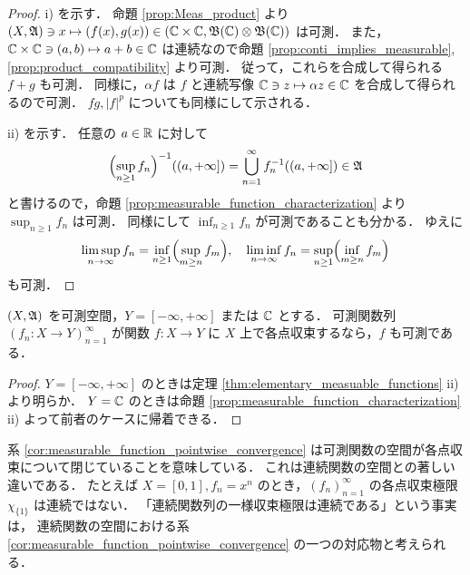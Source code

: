 \begin{proof}
    \textrm{i)} を示す．
    命題 \ref{prop:Meas_product} より $(X,\mathfrak{A})\ni x\mapsto(f(x),g(x))\in(\mathbb{C}\times\mathbb{C},\mathfrak{B}(\mathbb{C})\otimes\mathfrak{B}(\mathbb{C}))$ は可測．
    また，$\mathbb{C}\times\mathbb{C}\ni(a,b)\mapsto a+b\in\mathbb{C}$ は連続なので命題 \ref{prop:conti_implies_measurable}, \ref{prop:product_compatibility} より可測．
    従って，これらを合成して得られる $f+g$ も可測．
    同様に，$\alpha f$ は $f$ と連続写像 $\mathbb{C}\ni z\mapsto\alpha z\in\mathbb{C}$ を合成して得られるので可測．
    $fg,|f|^p$ についても同様にして示される．

    \textrm{ii)} を示す．
    任意の $a\in\mathbb{R}$ に対して
    \begin{align*}
        \Bigl(\sup_{n\ge1}f_n\Bigr)^{-1}((a,+\infty])
        =\bigcup_{n=1}^\infty f_n^{-1}((a,+\infty])\in\mathfrak{A}
    \end{align*}
    と書けるので，命題 \ref{prop:measurable_function_characterization} より $\sup_{n\ge1}f_n$ は可測．
    同様にして $\inf_{n\ge1}f_n$ が可測であることも分かる．
    ゆえに
    \begin{align*}
        \limsup_{n\to\infty}f_n=\inf_{n\ge1}\Bigl(\sup_{m\ge n}f_m\Bigr),\quad
        \liminf_{n\to\infty}f_n=\sup_{n\ge1}\Bigl(\inf_{m\ge n}f_m\Bigr)
    \end{align*}
    も可測．
\end{proof}

\begin{corollary}\label{cor:measurable_function_pointwise_convergence}
    $(X,\mathfrak{A})$ を可測空間，$Y=[-\infty,+\infty]$ または $\mathbb{C}$ とする．
    可測関数列 $(f_n:X\to Y)_{n=1}^\infty$ が関数 $f:X\to Y$ に $X$ 上で各点収束するなら，$f$ も可測である．
\end{corollary}

\begin{proof}
    $Y=[-\infty,+\infty]$ のときは定理 \ref{thm:elementary_measuable_functions} \textrm{ii)} より明らか．
    $Y=\mathbb{C}$ のときは命題 \ref{prop:measurable_function_characterization} \textrm{ii)} よって前者のケースに帰着できる．
\end{proof}

\begin{remark}
    系 \ref{cor:measurable_function_pointwise_convergence} は可測関数の空間が各点収束について閉じていることを意味している．
    これは連続関数の空間との著しい違いである．
    たとえば $X=[0,1],f_n=x^n$ のとき，$(f_n)_{n=1}^\infty$ の各点収束極限 $\chi_{\{1\}}$ は連続ではない．
    「連続関数列の一様収束極限は連続である」という事実は，
    連続関数の空間における系 \ref{cor:measurable_function_pointwise_convergence} の一つの対応物と考えられる．
\end{remark}
